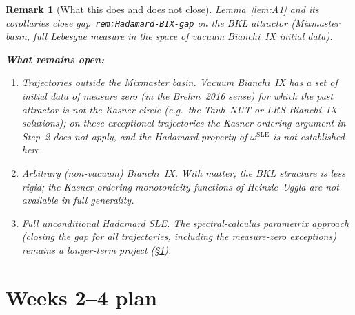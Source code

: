 \documentclass[11pt]{article}
\newtheorem{remark}[lemma]{Remark}
\theoremstyle{definition}
\begin{document}
\begin{remark}[What this does and does not close]\label{rem:honest-scope}
  Lemma~\ref{lem:A1} and its corollaries close gap~\texttt{rem:Hadamard-BIX-gap}
  \emph{on the BKL attractor} (Mixmaster basin, full Lebesgue measure in the
  space of vacuum Bianchi~IX initial data).

  \textbf{What remains open:}
  \begin{enumerate}
    \item[(i)] \emph{Trajectories outside the Mixmaster basin.}  Vacuum Bianchi~IX
      has a set of initial data of measure zero (in the Brehm~2016 sense) for
      which the past attractor is \emph{not} the Kasner circle (e.g.\ the
      Taub--NUT or LRS Bianchi~IX solutions); on these exceptional trajectories
      the Kasner-ordering argument in Step~2 does not apply, and the Hadamard
      property of $\omega^{\mathrm{SLE}}$ is not established here.

    \item[(ii)] \emph{Arbitrary (non-vacuum) Bianchi~IX.}  With matter, the BKL
      structure is less rigid; the Kasner-ordering monotonicity functions of
      Heinzle--Uggla are not available in full generality.

    \item[(iii)] \emph{Full unconditional Hadamard SLE.}  The spectral-calculus
      parametrix approach (closing the gap for all trajectories, including the
      measure-zero exceptions) remains a longer-term project (\S\ref{sec:weeks2-4}).
  \end{enumerate}
\end{remark}

\section{Weeks 2--4 plan}\label{sec:weeks2-4}
\end{document}
